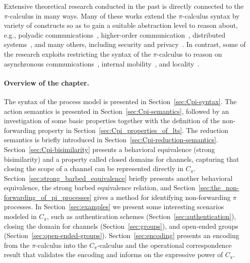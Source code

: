Extensive theoretical research conducted in the past is directly connected to the $\pi$-calculus in many ways. 
Many of these works extend the $\pi$-calculus syntax by variety of constructs so as to gain a suitable abstraction level to reason about, e.g.,  
polyadic communications~\cite{DBLP:journals/njc/CarboneM03, DBLP:conf/concur/Milner92}, 
higher-order communication~\cite{DBLP:conf/csl/Milner93}, 
distributed systems~\cite{DBLP:books/daglib/0018113}, and many others, including 
security and privacy~\cite{appliedpi,spi,cardelli05,pigroups,Giunti,hennessy05}.
In contrast, some of the research exploits restricting the syntax of the $\pi$-calculus to reason on asynchronous communications~\cite{boudol:inria-00076939, DBLP:conf/ecoop/HondaT91}, internal mobility~\cite{DBLP:journals/tcs/Sangiorgi96a}, and locality~\cite{merro04}.



\paragraph{Overview of the chapter.}
The syntax of the process model is presented in Section~\ref{sec:Cpi-syntax}. 
The action semantics is presented in Section~\ref{sec:Cpi-semantics}, followed by an investigation of some basic properties together with the definition of the non-forwarding property in Section~\ref{sec:Cpi_properties_of_lts}. The reduction semantics is briefly introduced in Section~\ref{sec:Cpi-reduction-semantics}. 
Section~\ref{sec:Cpi-bisimilarity} presents a behavioral equivalence (strong bisimilarity) and a property called closed domains for channels, capturing that closing the scope of a channel can be represented directly in $C_\pi$. 
Section~\ref{sec:strong_barbed_equivalence} briefly presents another behavioral equivalence, the strong barbed equivalence relation, and Section~\ref{sec:the_non-forwarding_of_pi_processes} gives a method for identifying non-forwarding $\pi$ processes.
In Section~\ref{sec:examples} we present some interesting scenarios modeled in $C_\pi$, such as  authentication schemes (Section~\ref{sec:authentication}), closing the domain for channels (Section~\ref{sec:groups}), and open-ended groups (Section~\ref{sec:open-ended-groups}). Section~\ref{sec:encoding} presents an encoding from the $\pi$-calculus into the $C_\pi$-calculus and the operational correspondence result that validates the encoding and informs on the expressive power of $C_\pi$. 



